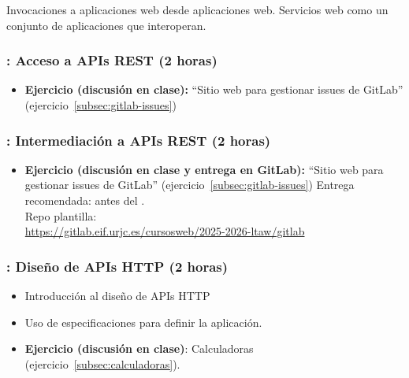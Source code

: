 \documentclass[a4paper,12pt]{article}
\begin{document}
Invocaciones a aplicaciones web desde aplicaciones web. Servicios web como un conjunto de aplicaciones que interoperan.

\subsubsection{\lunesE: Acceso a APIs REST (2 horas)}
\label{cal:lunesE}

\begin{itemize}
\item \textbf{Ejercicio (discusión en clase):} ``Sitio web para gestionar issues de GitLab'' (ejercicio~\ref{subsec:gitlab-issues})
\end{itemize}

\subsubsection{\martesE: Intermediación a APIs REST (2 horas)}
\label{cal:martesE}

\begin{itemize}
\item \textbf{Ejercicio (discusión en clase y entrega en GitLab):} ``Sitio web para gestionar issues de GitLab'' (ejercicio~\ref{subsec:gitlab-issues})
  Entrega recomendada: antes del \martesF. \\
  Repo plantilla: \\ {\footnotesize \url{https://gitlab.eif.urjc.es/cursosweb/2025-2026-ltaw/gitlab}}
\end{itemize}


\subsubsection{\lunesF: Diseño de APIs HTTP  (2 horas)}
\label{cal:lunesF}

\begin{itemize}
\item Introducción al diseño de APIs HTTP
\item Uso de especificaciones para definir la aplicación.
\item \textbf{Ejercicio (discusión en clase)}: Calculadoras (ejercicio~\ref{subsec:calculadoras}).
\end{itemize}

\end{document}

